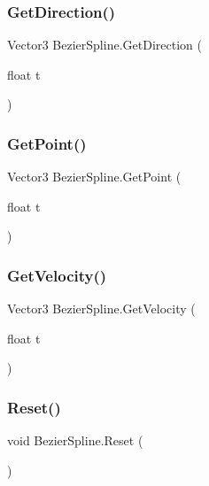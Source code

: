 \subsubsection{\texorpdfstring{Get\+Direction()}{GetDirection()}}
{\footnotesize\ttfamily Vector3 Bezier\+Spline.\+Get\+Direction (\begin{DoxyParamCaption}\item[{float}]{t }\end{DoxyParamCaption})\hspace{0.3cm}{\ttfamily [inline]}}

\mbox{\label{classBezierSpline_a4a9993e2dafa4a6b8819d94a25c70245}} 
\subsubsection{\texorpdfstring{Get\+Point()}{GetPoint()}}
{\footnotesize\ttfamily Vector3 Bezier\+Spline.\+Get\+Point (\begin{DoxyParamCaption}\item[{float}]{t }\end{DoxyParamCaption})\hspace{0.3cm}{\ttfamily [inline]}}

\mbox{\label{classBezierSpline_a0d8c73af995773501fd3e5c4dac4c3b6}} 
\subsubsection{\texorpdfstring{Get\+Velocity()}{GetVelocity()}}
{\footnotesize\ttfamily Vector3 Bezier\+Spline.\+Get\+Velocity (\begin{DoxyParamCaption}\item[{float}]{t }\end{DoxyParamCaption})\hspace{0.3cm}{\ttfamily [inline]}}

\mbox{\label{classBezierSpline_a69c0d6f430f28fec72bffb8812861247}} 
\subsubsection{\texorpdfstring{Reset()}{Reset()}}
{\footnotesize\ttfamily void Bezier\+Spline.\+Reset (\begin{DoxyParamCaption}{ }\end{DoxyParamCaption})\hspace{0.3cm}{\ttfamily [inline]}}

